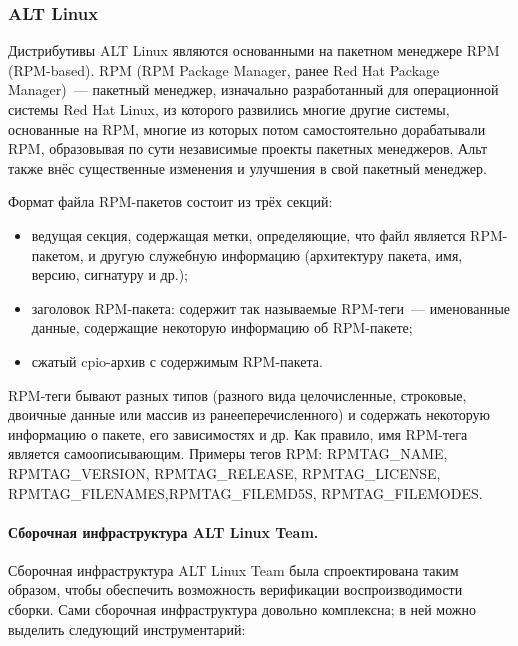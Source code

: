 \documentclass[10pt, a5paper]{article}
\begin{document}
\subsubsection*{ALT Linux}

Дистрибутивы ALT Linux являются основанными на пакетном менеджере RPM~\cite{Seleznev-1} (RPM-based). RPM (RPM Package Manager, ранее Red Hat Package Manager)~--- пакетный менеджер, изначально разработанный для операционной системы Red Hat Linux, из которого развились многие другие системы, основанные на RPM, многие из которых потом самостоятельно дорабатывали RPM, образовывая по сути независимые проекты пакетных менеджеров. Альт также внёс существенные изменения и улучшения в свой пакетный менеджер.

Формат файла RPM-пакетов состоит из трёх секций:

\begin{itemize}
  \item ведущая секция, содержащая метки, определяющие, что файл является RPM-пакетом, и другую служебную информацию (архитектуру пакета, имя, версию, сигнатуру и др.);
  \item заголовок RPM-пакета: содержит так называемые RPM-теги~--- именованные данные, содержащие некоторую информацию об RPM-пакете;
  \item сжатый cpio-архив с содержимым RPM-пакета.
\end{itemize}

RPM-теги бывают разных типов (разного вида целочисленные, строковые, двоичные данные или массив из ранееперечисленного) и содержать некоторую информацию о пакете, его зависимостях и др. Как правило, имя RPM-тега является самоописывающим. Примеры тегов RPM: RPMTAG\_NAME, RPMTAG\_VERSION, RPMTAG\_RELEASE, RPMTAG\_LICENSE, RPMTAG\_FILENAMES,\linebreak RPMTAG\_FILEMD5S, RPMTAG\_FILEMODES.

\paragraph{Сборочная инфраструктура ALT Linux Team.}

Сборочная инфраструктура ALT Linux Team была спроектирована таким образом, чтобы обеспечить возможность верификации воспроизводимости сборки.
Сами сборочная инфраструктура довольно комплексна; в ней можно выделить следующий инструментарий:
\end{document}
